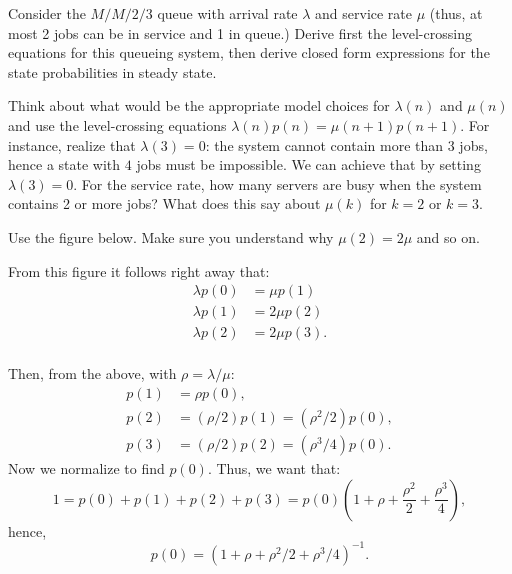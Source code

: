 \begin{exercise}{\faFlask}
Consider the $M/M/2/3$ queue with arrival rate $\lambda$ and
service rate $\mu$ (thus, at most 2 jobs can be in service and 1 in queue.)
 Derive first the level-crossing equations for this queueing system, then  derive closed form expressions for the state    probabilities in steady state. 
  \begin{hint}
 Think about what would be the appropriate model choices for
   $\lambda(n)$ and $\mu(n)$ and use the level-crossing equations
   $\lambda(n) p(n) = \mu(n+1)p(n+1)$.  For instance, realize that
   $\lambda(3)=0$: the system cannot contain more than 3 jobs, hence a
   state with $4$ jobs must be impossible. We can achieve that by
   setting $\lambda(3)=0$. For the service rate, how many servers are
   busy when the system contains 2 or more jobs?  What does this say
   about $\mu(k)$ for $k=2$ or $k=3$.
  \end{hint}
  \begin{solution}
 Use the figure below. Make sure you understand why $\mu(2)=2\mu$ and so on. 
    \begin{center}
      
    \end{center}

From this figure it follows right away that:
    \begin{align*}
   \lambda p(0) &= \mu p(1) \\
   \lambda p(1)  &= 2\mu p(2) \\
   \lambda p(2)  &= 2\mu p(3).\\
    \end{align*}

Then,  from the above, with $\rho=\lambda/\mu$: 
    \begin{align*}
      p(1) &= \rho p(0), \\
      p(2) &= (\rho/2) p(1) = (\rho^2/2) p(0), \\
      p(3) &= (\rho/2) p(2) = (\rho^3/4) p(0).
    \end{align*}
Now we normalize to find $p(0)$. Thus, we want that:
\begin{equation*}
  1 = p(0)+p(1)+p(2)+p(3) = p(0)\left(1 + \rho + \frac{\rho^2}2 + \frac{\rho^3}4\right),
\end{equation*}
hence,
\begin{equation*}
p(0) = (1+\rho + \rho^2/2 + \rho^3/4)^{-1}.
\end{equation*}
   \end{solution}
\end{exercise}


